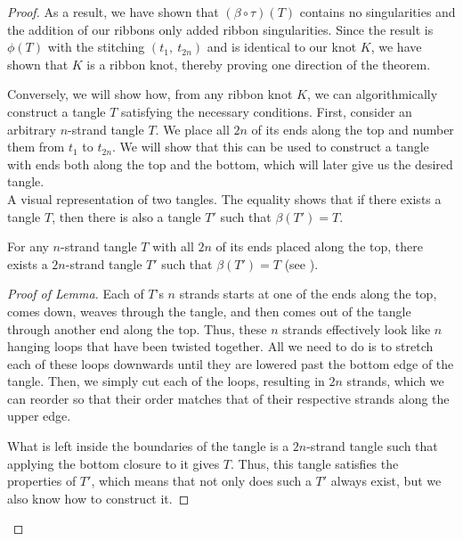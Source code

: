 \begin{paper}
\begin{proof}
As a result, we have shown that $(\beta\circ\tau)(T)$ contains no singularities
and the addition of our ribbons only added ribbon singularities.
Since the result is $\phi(T)$ with the stitching $(t_1,~t_{2n})$ and is
identical to our knot $K$, we have shown that $K$ is a ribbon knot, thereby
proving one direction of the theorem.

Conversely, we will show how, from any ribbon knot $K$, we can algorithmically
construct a tangle $T$ satisfying the necessary conditions.
First, consider an arbitrary $n$-strand tangle $T$.
We place all $2n$ of its ends along the top and number them from $t_1$ to
$t_{2n}$.
We will show that this can be used to construct a tangle with ends both along
the top and the bottom, which will later give us the desired tangle.\\

{A visual representation of two tangles.
The equality shows that if there exists a tangle $T$, then there is also a
tangle $T'$ such that $\beta(T')=T$.}

{For any $n$-strand tangle $T$ with all $2n$ of its ends placed along the top,
there exists a $2n$-strand tangle $T'$ such that $\beta(T')=T$ (see \figLemma).}
\begin{proof}[Proof of Lemma]
Each of $T$'s $n$ strands starts at one of the ends along the top, comes down,
weaves through the tangle, and then comes out of the tangle through another end
along the top.
Thus, these $n$ strands effectively look like $n$ hanging loops that have been
twisted together.
All we need to do is to stretch each of these loops downwards until they are
lowered past the bottom edge of the tangle.
Then, we simply cut each of the loops, resulting in $2n$ strands, which we can
reorder so that their order matches that of their respective strands along the
upper edge.

What is left inside the boundaries of the tangle is a $2n$-strand tangle such
that applying the bottom closure to it gives $T$.
Thus, this tangle satisfies the properties of $T'$, which means that not only
does such a $T'$ always exist, but we also know how to construct it.
\end{proof}


\end{proof}
\end{paper}
